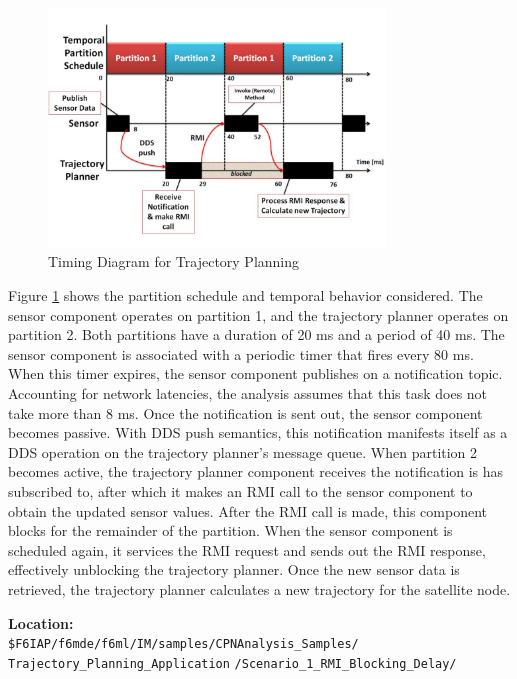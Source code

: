 \begin{figure}[ht]
\centering
\includegraphics[width=0.8\textwidth]{./figs/CPN_TPA_TD}
\caption{Timing Diagram for Trajectory Planning}
\label{fig:tpa_td}
\vspace{-0.2in}
\end{figure}
\vspace{0.1in}

Figure \ref{fig:tpa_td} shows the partition schedule and temporal behavior considered. The sensor component operates on partition 1, and the trajectory planner operates on partition 2. Both partitions have a duration of 20 ms and a period of 40 ms. The sensor component is associated with a periodic timer that fires every 80 ms. When this timer expires, the sensor component publishes on a notification topic. Accounting for network latencies, the analysis assumes that this task does not take more than 8 ms. Once the notification is sent out, the sensor component becomes passive. With DDS push semantics, this notification manifests itself as a DDS operation on the trajectory planner's message queue. When partition 2 becomes active, the trajectory planner component receives the notification is has subscribed to, after which it makes an RMI call to the sensor component to obtain the updated sensor values. After the RMI call is made, this component blocks for the remainder of the partition. When the sensor component is scheduled again, it services the RMI request and sends out the RMI response, effectively unblocking the trajectory planner. Once the new sensor data is retrieved, the trajectory planner calculates a new trajectory for the satellite node. 

\vspace{0.1in}
\noindent\textbf{Location:}\\
\texttt{\$F6IAP/f6mde/f6ml/IM/samples/CPNAnalysis\_Samples/ \\ Trajectory\_Planning\_Application}
   \texttt{/Scenario\_1\_RMI\_Blocking\_Delay/}
	
